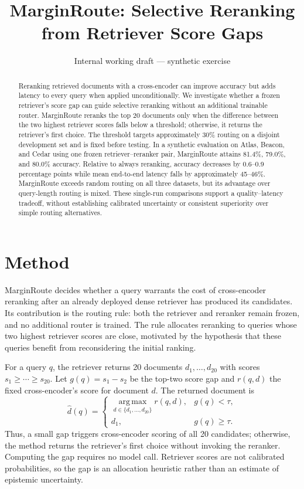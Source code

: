 \documentclass[11pt]{article}
\title{MarginRoute: Selective Reranking from Retriever Score Gaps}
\author{}
\date{Internal working draft --- synthetic exercise}
\begin{document}
\maketitle

\begin{abstract}
Reranking retrieved documents with a cross-encoder can improve accuracy but adds latency to every query when applied unconditionally. We investigate whether a frozen retriever's score gap can guide selective reranking without an additional trainable router. MarginRoute reranks the top 20 documents only when the difference between the two highest retriever scores falls below a threshold; otherwise, it returns the retriever's first choice. The threshold targets approximately 30\% routing on a disjoint development set and is fixed before testing. In a synthetic evaluation on Atlas, Beacon, and Cedar using one frozen retriever--reranker pair, MarginRoute attains 81.4\%, 79.0\%, and 80.0\% accuracy. Relative to always reranking, accuracy decreases by 0.6--0.9 percentage points while mean end-to-end latency falls by approximately 45--46\%. MarginRoute exceeds random routing on all three datasets, but its advantage over query-length routing is mixed. These single-run comparisons support a quality--latency tradeoff, without establishing calibrated uncertainty or consistent superiority over simple routing alternatives.
\end{abstract}

\section{Method}
\label{sec:method}

MarginRoute decides whether a query warrants the cost of cross-encoder reranking after an already deployed dense retriever has produced its candidates. Its contribution is the routing rule: both the retriever and reranker remain frozen, and no additional router is trained. The rule allocates reranking to queries whose two highest retriever scores are close, motivated by the hypothesis that these queries benefit from reconsidering the initial ranking.

For a query $q$, the retriever returns 20 documents $d_1,\ldots,d_{20}$ with scores $s_1\geq\cdots\geq s_{20}$. Let $g(q)=s_1-s_2$ be the top-two score gap and $r(q,d)$ the fixed cross-encoder's score for document $d$. The returned document is
\begin{equation}
\label{eq:marginroute}
\widehat d(q)=
\begin{cases}
\displaystyle\operatorname*{arg\,max}_{d\in\{d_1,\ldots,d_{20}\}} r(q,d),
    & g(q)<\tau,\\
d_1, & g(q)\geq\tau.
\end{cases}
\end{equation}
Thus, a small gap triggers cross-encoder scoring of all 20 candidates; otherwise, the method returns the retriever's first choice without invoking the reranker. Computing the gap requires no model call. Retriever scores are not calibrated probabilities, so the gap is an allocation heuristic rather than an estimate of epistemic uncertainty.
\end{document}
